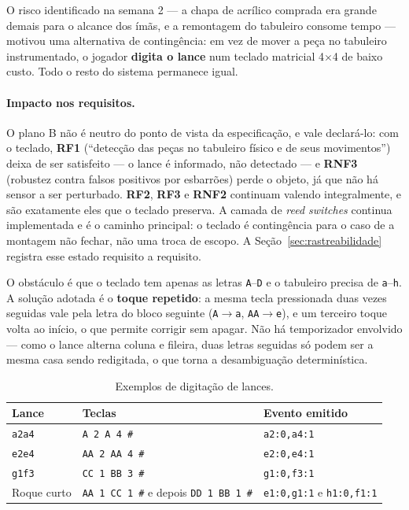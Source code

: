 \documentclass[12pt,a4paper]{article}
\begin{document}
O risco identificado na semana 2 --- a chapa de acrílico comprada era grande
demais para o alcance dos ímãs, e a remontagem do tabuleiro consome tempo ---
motivou uma alternativa de contingência: em vez de mover a peça no tabuleiro
instrumentado, o jogador \textbf{digita o lance} num teclado matricial 4$\times$4
de baixo custo. Todo o resto do sistema permanece igual.

\paragraph{Impacto nos requisitos.} O plano B não é neutro do ponto de vista da
especificação, e vale declará-lo: com o teclado, \textbf{RF1} (``detecção das
peças no tabuleiro físico e de seus movimentos'') deixa de ser satisfeito ---
o lance é informado, não detectado --- e \textbf{RNF3} (robustez contra falsos
positivos por esbarrões) perde o objeto, já que não há sensor a ser
perturbado. \textbf{RF2}, \textbf{RF3} e \textbf{RNF2} continuam valendo
integralmente, e são exatamente eles que o teclado preserva. A camada de
\emph{reed switches} continua implementada e é o caminho principal: o teclado é
contingência para o caso de a montagem não fechar, não uma troca de escopo. A
Seção~\ref{sec:rastreabilidade} registra esse estado requisito a requisito.

O obstáculo é que o teclado tem apenas as letras \texttt{A}--\texttt{D} e o
tabuleiro precisa de \texttt{a}--\texttt{h}. A solução adotada é o
\textbf{toque repetido}: a mesma tecla pressionada duas vezes seguidas vale
pela letra do bloco seguinte (\texttt{A}$\to$\texttt{a}, \texttt{AA}$\to$\texttt{e}),
e um terceiro toque volta ao início, o que permite corrigir sem apagar. Não há
temporizador envolvido --- como o lance alterna coluna e fileira, duas letras
seguidas só podem ser a mesma casa sendo redigitada, o que torna a
desambiguação determinística.

\begin{table}[H]
\centering
\caption{Exemplos de digitação de lances.}
\label{tab:teclas}
\begin{tabular}{@{}lll@{}}
\toprule
\textbf{Lance} & \textbf{Teclas} & \textbf{Evento emitido} \\
\midrule
\texttt{a2a4} & \texttt{A 2 A 4 \#}       & \texttt{a2:0,a4:1} \\
\texttt{e2e4} & \texttt{AA 2 AA 4 \#}     & \texttt{e2:0,e4:1} \\
\texttt{g1f3} & \texttt{CC 1 BB 3 \#}     & \texttt{g1:0,f3:1} \\
Roque curto   & \texttt{AA 1 CC 1 \#} e depois \texttt{DD 1 BB 1 \#} & \texttt{e1:0,g1:1} e \texttt{h1:0,f1:1} \\
\bottomrule
\end{tabular}
\end{table}
\end{document}

